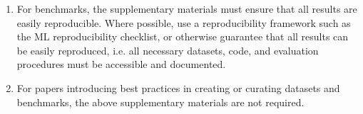 \documentclass{article}
\begin{document}
\begin{enumerate}
\item For benchmarks, the supplementary materials must ensure that all results are easily reproducible. Where possible, use a reproducibility framework such as the ML reproducibility checklist, or otherwise guarantee that all results can be easily reproduced, i.e. all necessary datasets, code, and evaluation procedures must be accessible and documented.

\item For papers introducing best practices in creating or curating datasets and benchmarks, the above supplementary materials are not required.
\end{enumerate}
\end{document}
